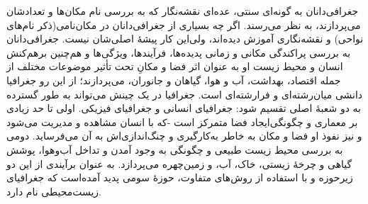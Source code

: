 \documentclass{article}
\begin{document}
\begin{figwindow}
جغرافی‌دانان به گونه‌ای سنتی، عده‌ای نقشه‌نگار که به بررسی نام مکان‌ها و تعدادشان می‌پردازند، به نظر می‌رسند. اگر چه بسیاری از جغرافی‌دانان در مکان‌نامی(ذکر نام‌های نواحی) و نقشه‌نگاری آموزش دیده‌اند، ولی‌این کار پیشهٔ اصلی‌شان نیست. جغرافی‌دانان به بررسی پراکندگی مکانی و زمانی پدیده‌ها، فرآیندها، ویژگی‌ها و هم‌چنین برهم‌کنش انسان و محیط زیست او به عنوان اثر فضا و مکانِ تحت تأثیر موضوعات مختلف از جمله اقتصاد، بهداشت، آب و هوا، گیاهان و جانوران، می‌پردازند؛ از این رو جغرافیا دانشی میان‌رشته‌ای و فرارشته‌ای است.
جغرافیا در یک چینش می‌تواند به طور گسترده به دو شعبهٔ اصلی تقسیم شود: جغرافیای انسانی و جغرافیای فیزیکی. اولی تا حد زیادی بر معماری و چگونگی‌ایجاد فضا متمرکز است -که با انسان مشاهده و مدیریت می‌شود و نیز نفوذ او فضا و مکان به خاطر به‌کارگیری و چنگ‌اندازی‌اش به آن می‌فرساید. دومی به بررسی محیط زیست طبیعی و چگونگی به وجود آمدن و تداخل آب‌وهوا، پوشش گیاهی و چرخهٔ زیستی، خاک، آب، و زمین‌چهره می‌پردازد. به عنوان برآیندی از این دو زیرحوزه و با استفاده از روش‌های متفاوت، حوزهٔ سومی پدید آمده‌است که جغرافیای زیست‌محیطی نام دارد.
\end{figwindow}
\end{document}
